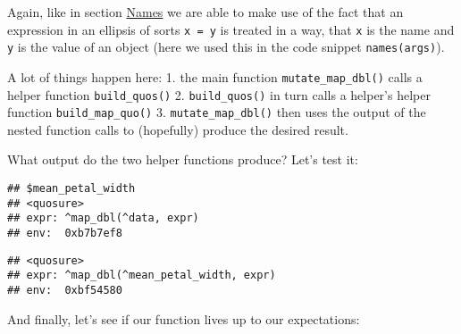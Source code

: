 \documentclass[]{book}
\newenvironment{Shaded}{\begin{snugshade}}{\end{snugshade}}
\newcommand{\DataTypeTok}[1]{\textcolor[rgb]{0.13,0.29,0.53}{#1}}
\newcommand{\KeywordTok}[1]{\textcolor[rgb]{0.13,0.29,0.53}{\textbf{#1}}}
\newcommand{\NormalTok}[1]{#1}
\newcommand{\OperatorTok}[1]{\textcolor[rgb]{0.81,0.36,0.00}{\textbf{#1}}}
\newcommand{\StringTok}[1]{\textcolor[rgb]{0.31,0.60,0.02}{#1}}
\begin{document}
Again, like in section \protect\hyperlink{named}{Names} we are able to make use of the fact that an expression in an ellipsis of sorts \texttt{x\ =\ y} is treated in a way, that \texttt{x} is the name and \texttt{y} is the value of an object (here we used this in the code snippet \texttt{names(args)}).

A lot of things happen here:
1. the main function \texttt{mutate\_map\_dbl()} calls a helper function \texttt{build\_quos()}
2. \texttt{build\_quos()} in turn calls a helper's helper function \texttt{build\_map\_quo()}
3. \texttt{mutate\_map\_dbl()} then uses the output of the nested function calls to (hopefully) produce the desired result.

What output do the two helper functions produce? Let's test it:

\begin{Shaded}
\end{Shaded}

\begin{verbatim}
## $mean_petal_width
## <quosure>
## expr: ^map_dbl(^data, expr)
## env:  0xb7b7ef8
\end{verbatim}

\begin{Shaded}
\end{Shaded}

\begin{verbatim}
## <quosure>
## expr: ^map_dbl(^mean_petal_width, expr)
## env:  0xbf54580
\end{verbatim}

And finally, let's see if our function lives up to our expectations:

\begin{Shaded}
\end{Shaded}
\end{document}
